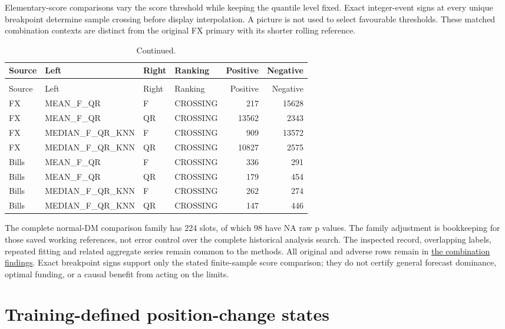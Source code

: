 \documentclass[11pt,a4paper]{article}
\begin{document}
Elementary-score comparisons vary the score threshold while
keeping the quantile level fixed. Exact integer-event signs at every unique
breakpoint determine sample crossing before display interpolation. A picture
is not used to select favourable thresholds. These matched combination
contexts are distinct from the original FX primary with its shorter rolling
reference.
\begingroup
\scriptsize
\setlength{\tabcolsep}{3pt}
\renewcommand{\arraystretch}{1.12}
\begin{longtable}{lp{34mm}p{18mm}lrr}
\caption{Every combination Murphy comparison in the original-primary contexts. Crossing prevents threshold-uniform sample dominance.}\\
\toprule
Source & Left & Right & Ranking & Positive & Negative \\
\midrule
\endfirsthead
\caption[]{Continued.}\\
\toprule
Source & Left & Right & Ranking & Positive & Negative \\
\midrule
\endhead
\bottomrule
\endfoot
FX & MEAN\_F\_QR & F & CROSSING & 217 & 15628 \\
FX & MEAN\_F\_QR & QR & CROSSING & 13562 & 2343 \\
FX & MEDIAN\_F\_QR\_KNN & F & CROSSING & 909 & 13572 \\
FX & MEDIAN\_F\_QR\_KNN & QR & CROSSING & 10827 & 2575 \\
Bills & MEAN\_F\_QR & F & CROSSING & 336 & 291 \\
Bills & MEAN\_F\_QR & QR & CROSSING & 179 & 454 \\
Bills & MEDIAN\_F\_QR\_KNN & F & CROSSING & 262 & 274 \\
Bills & MEDIAN\_F\_QR\_KNN & QR & CROSSING & 147 & 446 \\
\end{longtable}
\endgroup

The complete normal-DM comparison family has 224 slots,
of which 98 have NA raw p values.
The family adjustment is bookkeeping for those saved working references, not
error control over the complete historical analysis search. The inspected
record, overlapping labels, repeated fitting and related aggregate series
remain common to the methods. All original and adverse rows remain in
\href{https://github.com/ByronLi0207/financial-mathematics-paper-20261020/blob/revision-v7-final/results/revision-20261023/v6/wp3-findings.json}{the combination findings}.
Exact breakpoint signs support only the stated finite-sample score comparison;
they do not certify general forecast dominance, optimal funding, or a causal
benefit from acting on the limits.\section{Training-defined position-change states}\label{sup:wp4}
\end{document}
